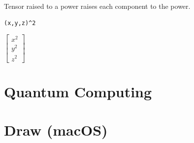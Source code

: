 \documentclass[12pt]{article}
\begin{document}
\bigskip
\noindent
Tensor raised to a power raises each component to the power.

{\color{blue}\begin{verbatim}
(x,y,z)^2
\end{verbatim}}

\noindent
$\displaystyle
\begin{bmatrix}
x^2
\\[1ex]
y^2
\\[1ex]
z^2
\end{bmatrix}
$

\newpage

















\newpage

\section{Quantum Computing}



\newpage

\section{Draw (macOS)}



\newpage



\newpage


\end{document}
